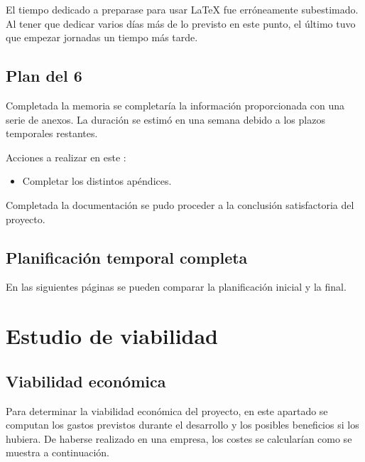 
El tiempo dedicado a preparase para usar \LaTeX{} fue erróneamente subestimado.
Al tener que dedicar varios días más de lo previsto en este punto, el último
 tuvo que empezar jornadas un tiempo más tarde.

\clearpage

\subsection{Plan del  6} \label{sec:plan-s6}
Completada la memoria se completaría la información proporcionada con una
serie de anexos. La duración se estimó en una semana debido a los plazos
temporales restantes.

Acciones a realizar en este :
\begin{itemize}
  \item Completar los distintos apéndices.
\end{itemize}


Completada la documentación se pudo proceder a la conclusión satisfactoria
del proyecto.

\clearpage

\subsection{Planificación temporal completa} \label{sec:plan-total}
En las siguientes páginas se pueden comparar la planificación inicial
y la final.





\newpage

\section{Estudio de viabilidad}
\subsection{Viabilidad económica}
Para determinar la viabilidad económica del proyecto, en este apartado se
computan los gastos previstos durante el desarrollo y los posibles beneficios
si los hubiera. De haberse realizado en una empresa, los costes se calcularían
como se muestra a continuación.

